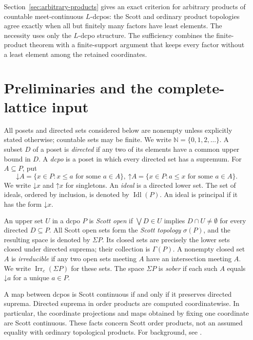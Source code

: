\documentclass[11pt,reqno]{amsart}
\theoremstyle{definition}
\theoremstyle{remark}
\numberwithin{equation}{section}
\newcommand{\N}{\mathbb N}
\newcommand{\down}[1]{\mathord{\downarrow}#1}
\newcommand{\up}[1]{\mathord{\uparrow}#1}
\newcommand{\Sc}{\sigma}
\newcommand{\Sig}{\Sigma}
\newcommand{\Idl}{\operatorname{Idl}}
\begin{document}
Section~\ref{sec:arbitrary-products} gives an exact criterion for arbitrary products of countable meet-continuous $L$-dcpos: the Scott and ordinary product topologies agree exactly when all but finitely many factors have least elements. The necessity uses only the $L$-dcpo structure. The sufficiency combines the finite-product theorem with a finite-support argument that keeps every factor without a least element among the retained coordinates.

\section{Preliminaries and the complete-lattice input}
All posets and directed sets considered below are nonempty unless explicitly stated otherwise; countable sets may be finite. We write $\N=\{0,1,2,\ldots\}$. A subset $D$ of a poset is \emph{directed} if any two of its elements have a common upper bound in $D$. A \emph{dcpo} is a poset in which every directed set has a supremum. For $A\subseteq P$, put
\[
 \down A=\{x\in P:x\le a\text{ for some }a\in A\},~
 \up A=\{x\in P:a\le x\text{ for some }a\in A\}.
\]
We write $\down x$ and $\up x$ for singletons. An \emph{ideal} is a directed lower set. The set of ideals, ordered by inclusion, is denoted by $\Idl(P)$. An ideal is principal if it has the form $\down x$.

An upper set $U$ in a dcpo $P$ is \emph{Scott open} if $\bigvee D\in U$ implies $D\cap U\ne\emptyset$ for every directed $D\subseteq P$. All Scott open sets form the \emph{Scott topology} $\Sc(P)$, and the resulting space is denoted by $\Sig P$. Its closed sets are precisely the lower sets closed under directed suprema; their collection is $\Gamma(P)$. A nonempty closed set $A$ is \emph{irreducible} if any two open sets meeting $A$ have an intersection meeting $A$. We write $\operatorname{Irr}_c(\Sig P)$ for these sets. The space $\Sig P$ is \emph{sober} if each such $A$ equals $\down a$ for a unique $a\in P$.

A map between dcpos is Scott continuous if and only if it preserves directed suprema. Directed suprema in order products are computed coordinatewise. In particular, the coordinate projections and maps obtained by fixing one coordinate are Scott continuous. These facts concern Scott order products, not an assumed equality with ordinary topological products. For background, see \cite{AbramskyJung,Gierz}.
\end{document}
